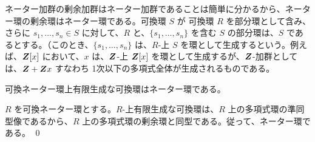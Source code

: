 \medskip
ネーター加群の剰余加群はネーター加群であることは簡単に分かるから、ネーター環の剰余環はネーター環である。可換環 $S$ が 可換環 $R$ を部分環として含み、さらに $s_1, \ldots, s_n\in S$ に対して、$R$ と、$\{s_1,\ldots, s_n\}$ を含む $S$ の部分環は、$S$ であるとする。（このとき、$\{s_1,\ldots, s_n\}$ は、$R$-上 $S$ を環として生成するという。例えば、$\mbox{\boldmath $Z$}[x]$ において、$x$ は、$\mbox{\boldmath $Z$}$-上 $\mbox{\boldmath $Z$}[x]$ を環として生成するが、$\mbox{\boldmath $Z$}$-加群としては、$\mbox{\boldmath $Z$} + \mbox{\boldmath $Z$} x$ すなわち 1次以下の多項式全体が生成されるものである。

\begin{cor}
可換ネーター環上有限生成な可換環はネーター環である。
\end{cor}
\proof
$R$ を可換ネーター環とする。$R$-上有限生成な可換環は、$R$ 上の多項式環の準同型像であるから、$R$ 上の多項式環の剰余環と同型である。従って、ネーター環である。
\qed


